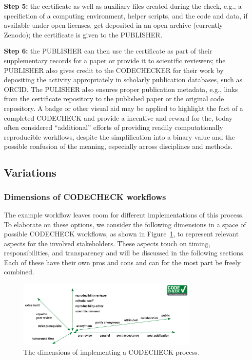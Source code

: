 \documentclass[12pt]{article}
\begin{document}
\textbf{Step 5:} the certificate as well as auxiliary files created during the check,
e.g., a specifiction of a computing environment, helper scripts, and the code and data,
if available under open licenses, get deposited in an open archive (currently Zenodo);
the certificate is given to the PUBLISHER.

\textbf{Step 6:} the PUBLISHER can then use the certificate as part of their
supplementary records for a paper or provide it to scientific reviewers; the
PUBLISHER also gives credit to the CODECHECKER for their work by depositing the
activity appropriately in scholarly publication databases, such as ORCID.
The PULISHER also ensures proper publication metadata, e.g., links from the 
certificate repository to the published paper or the original code repository.
A badge or other visual aid may be applied to highlight the fact of a completed
CODECHECK and provide a incentive and reward for the, today often considered
``additional'' efforts of providing readily computationally reproducible workflows,
despite the simplification into a binary value and the possible confusion of
the meaning, especially across disciplines and methods.

\subsection*{Variations}\label{variations}

\subsubsection*{Dimensions of CODECHECK workflows}\label{dimensions-of-workflows}

The example workflow leaves room for different
implementations of this process. To elaborate on these options, we consider
the following dimensions in a space of possible CODECHECK workflows, as shown in 
Figure~\ref{fig:dimensions}, to represent relevant aspects for the involved
stakeholders. These aspects touch on timing, responsibilities, and 
transparency and will be discussed in the following sections.
Each of these have their own pros and cons and can for the most part be
freely combined.

\begin{figure}
  \centering
      \includegraphics[width=0.8\textwidth]{figs/codecheck_dimensions.pdf}
  \caption{The dimensions of implementing a CODECHECK process.}
  \label{fig:dimensions}
\end{figure}
\end{document}

